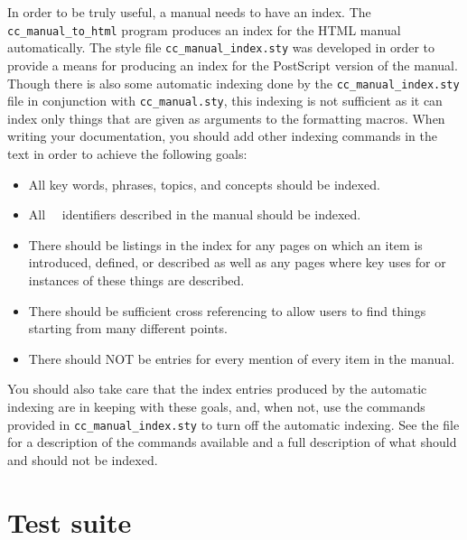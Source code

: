 In order to be truly useful, a manual needs to have an index.  The 
{\tt cc\_manual\_to\_html} program produces an index for the HTML manual
automatically.  %
The style file {\tt cc\_manual\_index.sty}%
 was developed in order to provide
a means for producing an index for the PostScript version of the manual.  
Though there is also some automatic indexing done by the
{\tt cc\_manual\_index.sty} file in conjunction with {\tt cc\_manual.sty},
this indexing is not sufficient as it can index only things that are
given as arguments to the formatting macros.  When writing your
documentation, you should add other indexing commands in the text in
order to achieve the following goals:
\begin{itemize}
   \item All key words, phrases, topics, and concepts should be indexed.
   \item All \cgal\ \CC\ identifiers described in the manual should be indexed.
   \item There should be listings in the index for any pages on which an
         item is introduced, defined, or described as well as any pages
         where key uses for or instances of these things are described.
   \item There should be sufficient cross referencing to allow users
         to find things starting from many different points.
   \item There should NOT be entries for every mention of every item in the
         manual.
\end{itemize}

You should also take care that the index entries produced by the automatic
indexing are in keeping with these goals, and, when not, use the commands
provided in {\tt cc\_manual\_index.sty} to turn off the automatic indexing.
See the file 
for a description of the commands available and a full description of what
should and should not be indexed.



\section{Test suite}
\label{sec:doc_test_suite}

